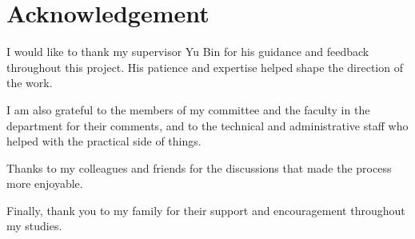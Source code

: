 \chapter*{Acknowledgement}

I would like to thank my supervisor Yu Bin for his guidance and feedback throughout this project. His patience and expertise helped shape the direction of the work.

I am also grateful to the members of my committee and the faculty in the department for their comments, and to the technical and administrative staff who helped with the practical side of things.

Thanks to my colleagues and friends for the discussions that made the process more enjoyable.

Finally, thank you to my family for their support and encouragement throughout my studies.
